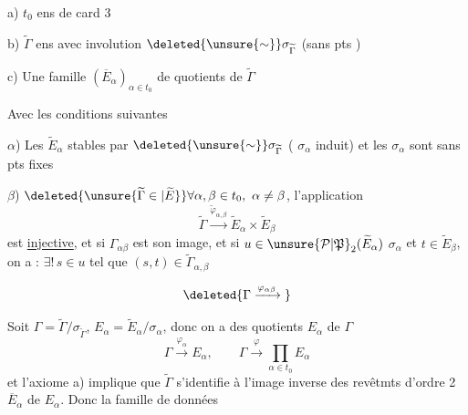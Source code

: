 a) $t_0$ ens de card 3

b) $\widetilde\Gamma$ ens \inserted{$\ne\varnothing$} avec involution $\deleted{\unsure{\sim}}\sigma_{\widetilde\Gamma}$ (sans pts )

c) Une famille $(\overline E_\alpha)_{\alpha\in t_0}$ de quotients de $\widetilde\Gamma$ 

Avec les conditions suivantes

$\alpha$) Les $\widetilde E_\alpha$ stables par $\deleted{\unsure{\sim}}\sigma_{\widetilde\Gamma}$ ( $\sigma_\alpha$ induit) et les $\sigma_\alpha$ sont sans pts fixes

$\beta$) $\deleted{\unsure{\widetilde\Gamma\in|\widetilde E}}\forall\alpha,\beta\in t_0,\ \alpha\ne\beta$, l'application
\[
\widetilde\Gamma\xrightarrow{\widetilde\varphi_{\alpha,\beta}}\widetilde E_\alpha\times\widetilde E_\beta
\]
est \uline{injective}, et si $\Gamma_{\alpha\beta}$ est son image,  et si $u\in\unsure{\mathcal P|\mathfrak P}_2(\widetilde E_\alpha)$   $\sigma_\alpha$  et $t\in\widetilde E_\beta$, on a : $\exists!\,s\in u$ tel que $(s,t)\in\widetilde\Gamma_{\alpha,\beta}$


\[
\deleted{\Gamma\xrightarrow{\varphi_{\alpha\beta}}{}}
\]

Soit  $\Gamma=\widetilde\Gamma/\sigma_{\widetilde\Gamma}$, $E_\alpha=\widetilde E_\alpha/\sigma_\alpha$, donc on a des quotients $E_\alpha$ de $\Gamma$
\[
\Gamma\xrightarrow{\varphi_\alpha} E_\alpha,\qquad\Gamma\xrightarrow{\varphi}\prod_{\alpha\in t_0}E_\alpha
\]
et l'axiome a) implique que \inserted{$\forall\alpha$,} $\widetilde\Gamma$ s'identifie à l'image inverse des revêtmts d'ordre 2 $\overline E_\alpha$ de $E_\alpha$. Donc la famille de données
